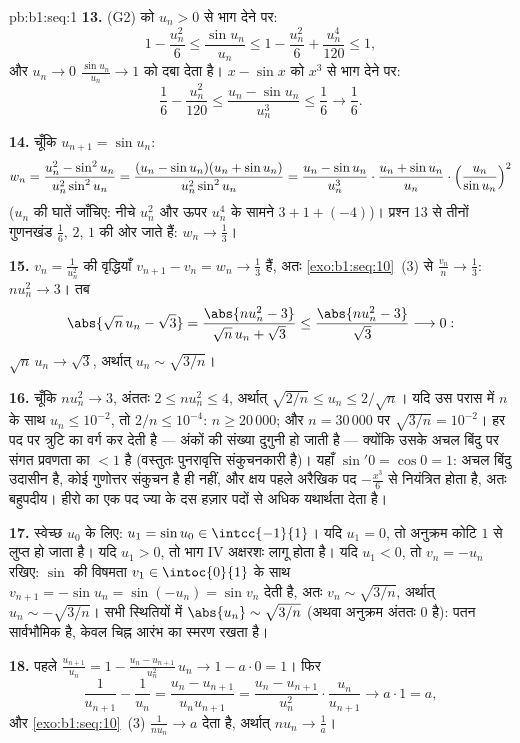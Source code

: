 \begin{solution}{pb:b1:seq:1}
\textbf{13.} (G2) को $u_n > 0$ से भाग देने पर:
\[
1 - \frac{u_n^2}{6} \leq \frac{\sin u_n}{u_n} \leq 1 -
\frac{u_n^2}{6} + \frac{u_n^4}{120} \leq 1 ,
\]
और $u_n \to 0$ $\frac{\sin u_n}{u_n} \to 1$ को दबा देता है। $x - \sin x$ को
$x^3$ से भाग देने पर:
\[
\frac16 - \frac{u_n^2}{120} \leq \frac{u_n - \sin u_n}{u_n^3}
\leq \frac16 \longrightarrow \frac16 .
\]

\textbf{14.} चूँकि $u_{n+1} = \sin u_n$:
\[
w_n = \frac{u_n^2 - \sin^2 u_n}{u_n^2 \sin^2 u_n}
= \frac{(u_n - \sin u_n)(u_n + \sin u_n)}{u_n^2 \sin^2 u_n}
= \frac{u_n - \sin u_n}{u_n^3}\cdot
\frac{u_n + \sin u_n}{u_n}\cdot
\Bigl(\frac{u_n}{\sin u_n}\Bigr)^{2}
\]
($u_n$ की घातें जाँचिए: नीचे $u_n^2$ और ऊपर $u_n^4$ के सामने $3 + 1 +
(-4)$)। प्रश्न 13 से तीनों गुणनखंड $\frac16$, $2$, $1$ की ओर जाते हैं: $w_n
\to \frac13$।

\textbf{15.} $v_n = \frac{1}{u_n^2}$ की वृद्धियाँ $v_{n+1} - v_n = w_n \to
\frac13$ हैं, अतः \cref{exo:b1:seq:10}~(3) से $\frac{v_n}{n} \to \frac13$:
$n u_n^2 \to 3$। तब
\[
\abs{\sqrt n\,u_n - \sqrt 3}
= \frac{\abs{n u_n^2 - 3}}{\sqrt n\,u_n + \sqrt 3}
\leq \frac{\abs{n u_n^2 - 3}}{\sqrt 3} \longrightarrow 0 :
\]
$\sqrt n\,u_n \to \sqrt 3$, अर्थात् $u_n \sim \sqrt{3/n}$।

\textbf{16.} चूँकि $n u_n^2 \to 3$, अंततः $2 \leq n u_n^2 \leq 4$, अर्थात्
$\sqrt{2/n} \leq u_n \leq 2/\sqrt n$। यदि उस परास में $n$ के साथ $u_n \leq
10^{-2}$, तो $2/n \leq 10^{-4}$: $n \geq 20\,000$; और $n = 30\,000$ पर
$\sqrt{3/n} = 10^{-2}$।  हर पद पर त्रुटि का वर्ग कर देती है ---
अंकों की संख्या दुगुनी हो जाती है --- क्योंकि उसके अचल बिंदु पर संगत प्रवणता
का  $< 1$ है (वस्तुतः पुनरावृत्ति संकुचनकारी है)। यहाँ $\sin' 0 = \cos
0 = 1$: अचल बिंदु उदासीन है, कोई गुणोत्तर संकुचन है ही नहीं, और क्षय पहले
अरैखिक पद $-\frac{x^3}{6}$ से नियंत्रित होता है, अतः बहुपदीय। हीरो का एक पद
ज्या के दस हज़ार पदों से अधिक यथार्थता देता है।

\textbf{17.} स्वेच्छ $u_0$ के लिए: $u_1 = \sin u_0 \in \intcc{-1}{1}$। यदि
$u_1 = 0$, तो अनुक्रम कोटि $1$ से लुप्त हो जाता है। यदि $u_1 > 0$, तो भाग IV
अक्षरशः लागू होता है। यदि $u_1 < 0$, तो $v_n = -u_n$ रखिए: $\sin$ की विषमता
$v_1 \in \intoc{0}{1}$ के साथ $v_{n+1} = -\sin u_n = \sin(-u_n) = \sin v_n$
देती है, अतः $v_n \sim \sqrt{3/n}$, अर्थात् $u_n \sim -\sqrt{3/n}$। सभी
स्थितियों में $\abs{u_n} \sim \sqrt{3/n}$ (अथवा अनुक्रम अंततः $0$ है): पतन
सार्वभौमिक है, केवल चिह्न आरंभ का स्मरण रखता है।

\textbf{18.} पहले $\frac{u_{n+1}}{u_n} = 1 - \frac{u_n -
u_{n+1}}{u_n^2}\,u_n \to 1 - a \cdot 0 = 1$। फिर
\[
\frac{1}{u_{n+1}} - \frac{1}{u_n}
= \frac{u_n - u_{n+1}}{u_n u_{n+1}}
= \frac{u_n - u_{n+1}}{u_n^2}\cdot\frac{u_n}{u_{n+1}}
\longrightarrow a \cdot 1 = a ,
\]
और \cref{exo:b1:seq:10}~(3) $\frac{1}{n u_n} \to a$ देता है, अर्थात् $n u_n
\to \frac1a$।


\end{solution}

